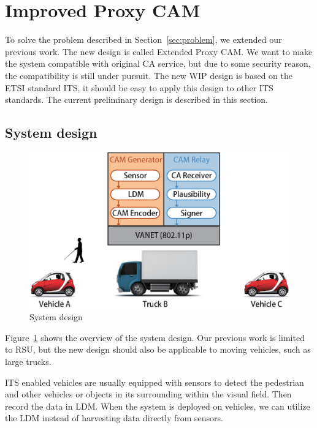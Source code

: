 \section{Improved Proxy CAM} \label{sec:iproxy_cam}

To solve the problem described in Section~\ref{sec:problem},
we extended our previous work.
The new design is called Extended Proxy CAM.
We want to make the system compatible with original CA service,
but due to some security reason, the compatibility is still under pursuit.
The new WIP design is based on the ETSI standard ITS,
it should be easy to apply this design to other ITS standards.
The current preliminary design is described in this section.

\subsection{System design}

\begin{figure}[htbp]
    \begin{center}
        \includegraphics[width=0.85\linewidth]{figures/exProxyCAM.eps}
        \caption{System design}
        \label{fig:system_design}
    \end{center}
\end{figure}

Figure~\ref{fig:system_design} shows the overview of the system design.
Our previous work is limited to RSU, but the new design should also be applicable to moving vehicles, such as large trucks.

ITS enabled vehicles are usually equipped with sensors to detect the pedestrian
and other vehicles or objects in its surrounding within the visual field.
Then record the data in LDM.
When the system is deployed on vehicles, we can utilize the LDM instead of harvesting data directly from sensors.

